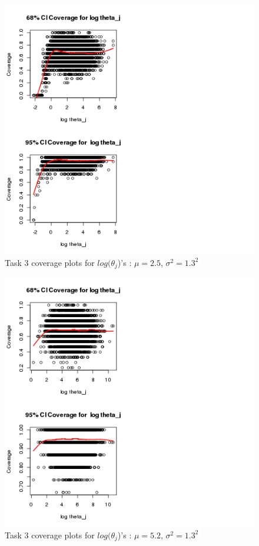 \documentclass[paper=a4, fontsize=11pt]{scrartcl}
\begin{document}
\begin{figure}[h!]
  \caption{Task 3 coverage plots for $log(\theta_{j}$)'s : $\mu = 2.5$, $\sigma^2 = 1.3^2$}
  \centering
	\includegraphics[scale=1, trim = 0 0 200 0]{keskici_wxiao_ps2_task3_plot2.png}
\end{figure}

\begin{figure}[h!]
  \caption{Task 3 coverage plots for $log(\theta_{j}$)'s : $\mu = 5.2$, $\sigma^2 = 1.3^2$}
  \centering
	\includegraphics[scale=1, trim = 0 0 200 0]{keskici_wxiao_ps2_task3_plot3.png}
\end{figure}
\end{document}
